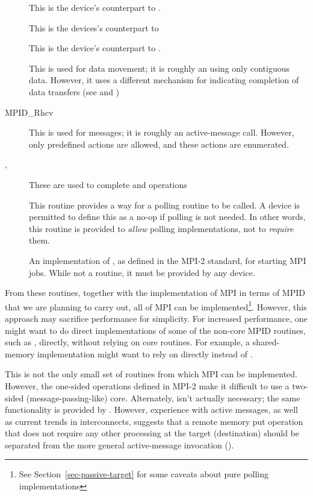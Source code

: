 \documentclass{article}
\begin{document}
\begin{description}
\item[]This is the device's counterpart to
. 
\item[]This is the devices's counterpart to
\item[]This is the device's counterpart to .
\item[]This is used for data movement; it is roughly an
 using only contiguous data.  However, it uses a
different mechanism for indicating completion of data transfers (see  and )
\item[MPID_Rhcv]This is used for messages; it is roughly an
active-message call.  However, only predefined actions are allowed,
and these actions are enumerated.
\item[, ]These are used to
  complete  
and  operations
\item[]This routine provides a way for a polling routine to
be called.  A device is permitted to define this as a no-op if polling
is not needed.  In other words, this routine is provided to
\emph{allow} polling implementations, not to \emph{require} them.
\item[]An implementation of , as defined in the
  MPI-2 standard, for starting MPI jobs.  While not a routine, it must be 
  provided by any device.  
\end{description}
From these routines, together with the implementation of MPI in terms of MPID
that we are planning to carry out, all of MPI can be implemented\footnote{See
Section~\ref{sec-passive-target} for some caveats about pure polling
implementations}.  However, this approach may sacrifice performance
for simplicity.  For increased performance, one might want to do direct
implementations of some of the non-core MPID routines, such as
, directly, without relying on core routines.  For example, a
shared-memory implementation might want to rely on  directly
instead of .

This is not the only small set of routines from which MPI can be
implemented.  However, the one-sided operations defined in MPI-2 make
it difficult to use a two-sided (message-passing-like) core.
Alternately,  isn't actually necessary; the same
functionality is provided by .  However, experience
with active messages, as well as current trends in interconnects,
suggests that a remote memory put operation that does not require any
other processing at the target (destination) should be separated from
the more general active-message invocation ().
\end{document}

